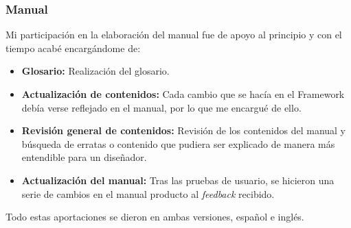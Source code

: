 \subsubsection*{Manual}
Mi participación en la elaboración del manual fue de apoyo al principio y con el tiempo acabé encargándome de:
\begin{itemize}
	\item \textbf{Glosario:} Realización del glosario.
	\item \textbf{Actualización de contenidos:} Cada cambio que se hacía en el Framework debía verse reflejado en el manual, por lo que me encargué de ello.
	\item \textbf{Revisión general de contenidos:} Revisión de los contenidos del manual y búsqueda de erratas o contenido que pudiera ser explicado de manera más entendible para un diseñador.
	\item \textbf{Actualización del manual:} Tras las pruebas de usuario, se hicieron una serie de cambios en el manual producto al \textit{feedback} recibido.
\end{itemize}

Todo estas aportaciones se dieron en ambas versiones, español e inglés.